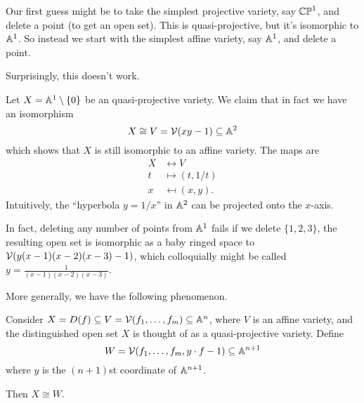\documentclass[11pt]{scrreprt}
\begin{document}
Our first guess might be to take the simplest projective variety,
say $\mathbb{CP}^1$, and delete a point (to get an open set).
This is quasi-projective, but it's isomorphic to $\mathbb A^1$.
So instead we start with the simplest affine variety,
say $\mathbb A^1$, and delete a point.

Surprisingly, this doesn't work.
\begin{example}
	Let $X = \mathbb A^1 \setminus \{0\}$ be an quasi-projective variety.
	We claim that in fact we have an isomorphism
	\[ X \cong V = \mathcal V(xy-1) \subseteq \mathbb A^2 \]
	which shows that $X$ is still isomorphic to an affine variety.
	The maps are
	\begin{align*}
		X & \leftrightarrow V \\
		t &\mapsto (t, 1/t) \\
		x &\mapsfrom (x, y).
	\end{align*}
	Intuitively, the ``hyperbola $y=1/x$'' in $\mathbb A^2$ can be projected
	onto the $x$-axis.
\end{example}
In fact, deleting any number of points from $\mathbb A^1$ fails
if we delete $\{1,2,3\}$, the resulting open set
is isomorphic as a baby ringed space to $\mathcal V(y(x-1)(x-2)(x-3)-1)$,
which colloquially might be called $y = \frac{1}{(x-1)(x-2)(x-3)}$.

More generally, we have the following phenomenon.
\begin{theorem}
	Consider $X = D(f) \subseteq V = \mathcal V(f_1, \dots, f_m) \subseteq \mathbb A^n$,
	where $V$ is an affine variety,
	and the distinguished open set $X$ is thought of as
	a quasi-projective variety.
	Define
	\[ W = \mathcal V(f_1, \dots, f_m, y \cdot f-1) \subseteq \mathbb A^{n+1} \]
	where $y$ is the $(n+1)$st coordinate of $\mathbb A^{n+1}$.

	Then $X \cong W$.
\end{theorem}
\end{document}
